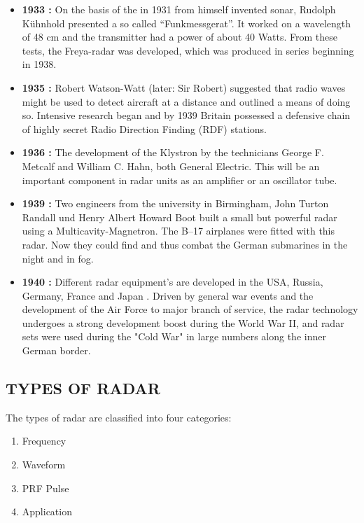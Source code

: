 \documentclass[14pt]{article} %
\begin{document}
\begin{itemize}
\item \textbf {1933 : }On the basis of the in 1931 from himself invented sonar, Rudolph Kühnhold presented a so called “Funkmessgerat”. It worked on a wavelength of 48 cm and the transmitter had a power of about 40 Watts. From these tests, the Freya-radar was developed, which was produced in series beginning in 1938.

\item \textbf {1935 : } Robert Watson-Watt (later: Sir Robert) suggested that radio waves might be used to detect aircraft at a distance and outlined a means of doing so. Intensive research began and by 1939 Britain possessed a defensive chain of highly secret Radio Direction Finding (RDF) stations.

\item \textbf {1936 :} The development of the Klystron by the technicians George F. Metcalf and William C. Hahn, both General Electric. This will be an important component in radar units as an amplifier or an oscillator tube.

\item \textbf {1939 : }Two engineers from the university in Birmingham, John Turton Randall und Henry Albert Howard Boot built a small but powerful radar using a Multicavity-Magnetron. The B–17 airplanes were fitted with this radar. Now they could find and thus combat the German submarines in the night and in fog.

\item \textbf {1940 :} Different radar equipment’s are developed in the USA, Russia, Germany, France and Japan
.
Driven by general war events and the development of the Air Force to major branch of service, the radar technology undergoes a strong development boost during the World War II, and radar sets were used during the "Cold War" in large numbers along the inner German border.
\end{itemize}

\subsection{ TYPES OF RADAR}
The types of radar are classified into four categories:
\begin{enumerate}
\item	Frequency 
\item	Waveform 
\item	PRF Pulse 
\item	Application
\end{enumerate}
\end{document}
